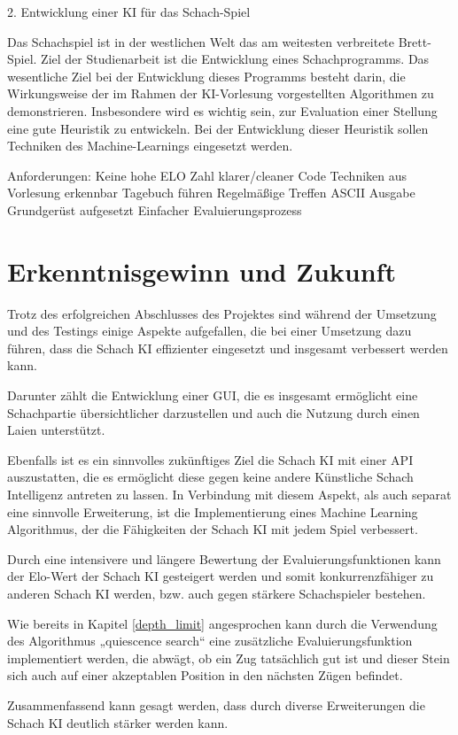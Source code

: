 2. Entwicklung einer KI für das Schach-Spiel

Das Schachspiel ist in der westlichen Welt das am weitesten verbreitete Brett-Spiel. Ziel der Studienarbeit
ist die Entwicklung eines Schachprogramms. Das wesentliche Ziel bei der Entwicklung dieses Programms
besteht darin, die Wirkungsweise der im Rahmen der KI-Vorlesung vorgestellten Algorithmen zu demonstrieren.
Insbesondere wird es wichtig sein, zur Evaluation einer Stellung eine gute Heuristik
zu entwickeln. Bei der Entwicklung dieser Heuristik sollen Techniken des Machine-Learnings eingesetzt
werden.

Anforderungen:
Keine hohe ELO Zahl
klarer/cleaner Code
Techniken aus Vorlesung erkennbar
Tagebuch führen
Regelmäßige Treffen
ASCII Ausgabe
Grundgerüst aufgesetzt
Einfacher Evaluierungsprozess
\fi

\section{Erkenntnisgewinn und Zukunft}
Trotz des erfolgreichen Abschlusses des Projektes sind während der Umsetzung und des Testings einige Aspekte aufgefallen, die bei einer Umsetzung dazu führen, dass die Schach KI effizienter eingesetzt und insgesamt verbessert werden kann.

Darunter zählt die Entwicklung einer GUI, die es insgesamt ermöglicht eine Schachpartie übersichtlicher darzustellen und auch die Nutzung durch einen Laien unterstützt.

Ebenfalls ist es ein sinnvolles zukünftiges Ziel die Schach KI mit einer API auszustatten, die es ermöglicht diese gegen keine andere Künstliche Schach Intelligenz antreten zu lassen. In Verbindung mit diesem Aspekt, als auch separat eine sinnvolle Erweiterung, ist die Implementierung eines Machine Learning Algorithmus, der die Fähigkeiten der Schach KI mit jedem Spiel verbessert.

Durch eine intensivere und längere Bewertung der Evaluierungsfunktionen kann der Elo-Wert der Schach KI gesteigert werden und somit konkurrenzfähiger zu anderen Schach KI werden, bzw. auch gegen stärkere Schachspieler bestehen.

Wie bereits in Kapitel \ref{depth_limit} angesprochen kann durch die Verwendung des Algorithmus „quiescence search“ eine zusätzliche Evaluierungsfunktion implementiert werden, die abwägt, ob ein Zug tatsächlich gut ist und dieser Stein sich auch auf einer akzeptablen Position in den nächsten Zügen befindet.

Zusammenfassend kann gesagt werden, dass durch diverse Erweiterungen die Schach KI deutlich stärker werden kann.
